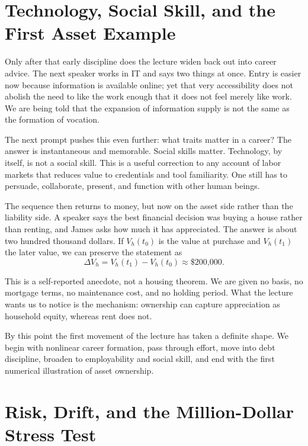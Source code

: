 \section{Technology, Social Skill, and the First Asset Example}

Only after that early discipline does the lecture widen back out into career advice. The next speaker works in IT and says two things at once. Entry is easier now because information is available online; yet that very accessibility does not abolish the need to like the work enough that it does not feel merely like work. We are being told that the expansion of information supply is not the same as the formation of vocation.

The next prompt pushes this even further: what traits matter in a career? The answer is instantaneous and memorable. Social skills matter. Technology, by itself, is not a social skill. This is a useful correction to any account of labor markets that reduces value to credentials and tool familiarity. One still has to persuade, collaborate, present, and function with other human beings.

The sequence then returns to money, but now on the asset side rather than the liability side. A speaker says the best financial decision was buying a house rather than renting, and James asks how much it has appreciated. The answer is about two hundred thousand dollars. If \(V_h(t_0)\) is the value at purchase and \(V_h(t_1)\) the later value, we can preserve the statement as
\begin{equation}
\Delta V_h = V_h(t_1)-V_h(t_0) \approx \text{\$200{,}000}.
\end{equation}

\begin{remark}
This is a self-reported anecdote, not a housing theorem. We are given no basis, no mortgage terms, no maintenance cost, and no holding period. What the lecture wants us to notice is the mechanism: ownership can capture appreciation as household equity, whereas rent does not.
\end{remark}

By this point the first movement of the lecture has taken a definite shape. We begin with nonlinear career formation, pass through effort, move into debt discipline, broaden to employability and social skill, and end with the first numerical illustration of asset ownership.

\section{Risk, Drift, and the Million-Dollar Stress Test}

